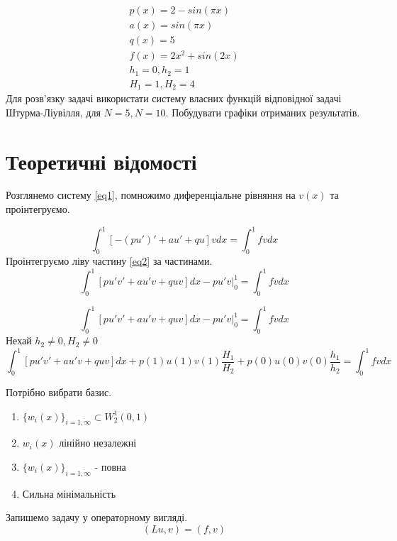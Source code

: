 \documentclass[14pt,a4paper]{scrartcl}
\begin{document}
	\begin{gather}
	p(x)= 2-sin(\pi x)\\
	a(x)= sin(\pi x)\\
	q(x)= 5\\
	f(x) = 2x^2 + sin(2x)\\
	h_1 = 0, h_2 = 1\\
	H_1= 1, H_2 = 4
	\end{gather}
	Для розв'язку задачі використати систему власних функцій відповідної задачі Штурма-Ліувілля, для $N=5,N=10$. Побудувати графіки отриманих результатів.
	
	\section{Теоретичні відомості}
	Розглянемо систему \ref{eq1}, помножимо диференціальне рівняння на $v(x)$ та проінтегруємо.
	
	\begin{equation} \label{eq2}
		\int_{0}^{1} \left[ -(p u')' + au' + qu\right]v dx = \int_{0}^{1} fv dx
	\end{equation}
	Проінтегруємо ліву частину \ref{eq2} за частинами.
	\begin{equation} \label{eq3}
		\int_{0}^{1} \left[ pu'v' + au'v + quv\right] dx - pu'v\big|_{0}^{1} = \int_{0}^{1} fv dx
	\end{equation}
	
	\begin{equation} \label{eq4}
		\int_{0}^{1} \left[ pu'v' + au'v + quv\right] dx - pu'v\big|_{0}^{1} = \int_{0}^{1} fv dx
	\end{equation}
	Нехай $h_2 \neq0, H_2 \neq0$
	\begin{equation} \label{eq5}
		\int_{0}^{1} \left[ pu'v' + au'v + quv\right] dx + p(1)u(1)v(1)\frac{H_1}{H_2} +p(0)u(0)v(0)\frac{h_1}{h_2} = \int_{0}^{1} fv dx
	\end{equation}
	
	Потрібно вибрати базис.
	\begin{enumerate}
		\item $\{ w_{i}(x) \}_{i=\overline{1,\infty}} \subset W_{2}^{1}(0,1)$ 
		\item $w_{i}(x)$ лінійно незалежні
		\item $\{ w_{i}(x) \}_{i=\overline{1,\infty}}$ - повна
		\item Сильна мінімальність
	\end{enumerate}
	
	Запишемо задачу у операторному вигляді. 
	\begin{equation} \label{eq6}
		\left(Lu,v\right) = \left(f,v\right)
	\end{equation}
	
\end{document}
